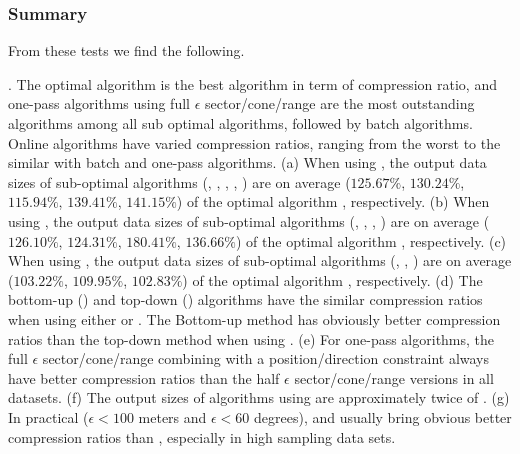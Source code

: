 \subsubsection{Summary}
From these tests we find the following.

\emph{}.
The optimal algorithm is the best algorithm in term of compression ratio, and one-pass algorithms using full $\epsilon$ sector/cone/range are the most outstanding algorithms among all sub optimal algorithms, followed by batch algorithms. Online algorithms have varied compression ratios, ranging from the worst to the similar with batch and one-pass algorithms.
(a) When using \ped, the output data sizes of sub-optimal algorithms (\tpa,
\dpa, \bqsa, \siped, \operb) are on average ($125.67\%$, $130.24\%$, $115.94\%$, $139.41\%$, $141.15\%$)
of the optimal algorithm \opt, respectively.
(b) When using \sed, the output data sizes of sub-optimal algorithms (\tpa,
\dpa, \squishe, \cised) are on average ($126.10\%$, $124.31\%$, $180.41\%$, $136.66\%$) of the optimal algorithm \opt, respectively.
(c) When using \dad, the output data sizes of sub-optimal algorithms (\tpa,
\dpa, \interval) are on average ($103.22\%$, $109.95\%$, $102.83\%$) of the optimal algorithm \opt, respectively.
(d) The bottom-up (\tpa) and top-down (\dpa) algorithms have the similar compression ratios when using either \ped or \sed. The Bottom-up method has obviously better compression ratios than the top-down method when using \dad.
(e) For one-pass algorithms, the full $\epsilon$ sector/cone/range combining with a position/direction constraint always have better compression ratios than the half $\epsilon$ sector/cone/range versions in all datasets. %
(f) The output sizes of algorithms using \sed are approximately twice of \ped.
(g) In practical (\eg $\epsilon <100$ meters and $\epsilon < 60$ degrees), \ped and \sed usually bring obvious better compression ratios than \dad, especially in high sampling data sets.

